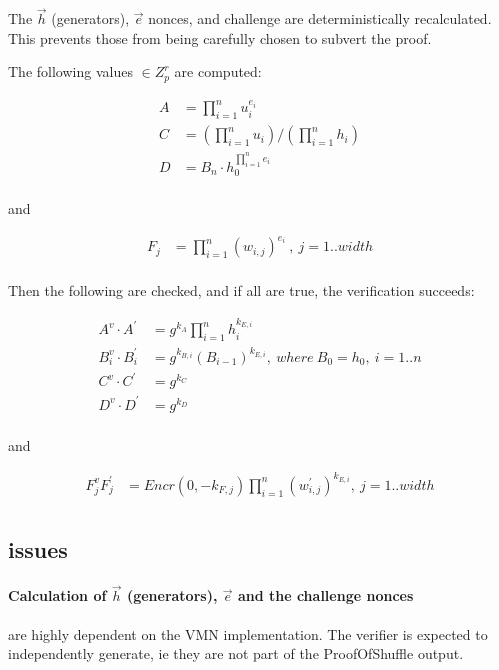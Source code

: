 \documentclass{article}
\begin{document}
The $\vec{h}$ (generators), $\vec{e}$ nonces, and challenge are
deterministically recalculated. This prevents those from being carefully
chosen to subvert the proof.

The following values $\in Z_{p}^{r}$ are computed:

\begin{align*}
A & =\prod_{i=1}^{n}u_{i}^{e_{i}}\\
C & =(\prod_{i=1}^{n}u_{i})/(\prod_{i=1}^{n}h_{i})\\
D & =B_{n}\cdot h_{0}^{\prod_{i=1}^{n}e_{i}}\\
\end{align*}

and

\begin{align*}
F_{j} & =\prod_{i=1}^{n}(w_{i,j})^{e_{i}}\ ,\ j=1..width\\
\end{align*}

Then the following are checked, and if all are true, the verification
succeeds:

\begin{align*}
A^{v}\cdot A^{\prime} & =g^{k_{A}}\prod_{i=1}^{n}h_{i}^{k_{E,i}}\\
B_{i}^{v}\cdot B_{i}^{\prime} & =g^{k_{B,i}}(B_{i-1})^{k_{E,i}},\ where\ B_{0}=h_{0},\ i=1..n\\
C^{v}\cdot C^{\prime} & =g^{k_{C}}\\
D^{v}\cdot D^{\prime} & =g^{k_{D}}\\
\end{align*}

and

\begin{align*}
F_{j}^{v}F_{j}^{\prime} & =Encr(0,-k_{F,j})\prod_{i=1}^{n}(w_{i,j}^{\prime})^{k_{E,i}},\ j=1..width\\
\end{align*}

\subsection*{issues}

\paragraph{Calculation of $\vec{h}$ (generators), $\vec{e}$ and the
challenge nonces} are highly dependent on the VMN implementation.
The verifier is expected to independently generate, ie they are not
part of the ProofOfShuffle output.
\end{document}
